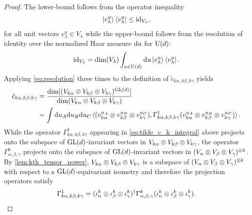 \documentclass[notitlepage, 10pt]{article}
\begin{document}
\begin{proof}
    The lower-bound follows from the operator inequality
     \begin{equation}
         \label{eq:inclusivity}
         \ket{v_{\lambda}^{u}}\bra{v_{\lambda}^{u}} \leq \operatorname{id}_{V_{\lambda}},
    \end{equation}
    for all unit vectors $v_{\lambda}^{u} \in V_{\lambda}$ while the upper-bound follows from the resolution of identity over the normalized Haar measure $\mathrm{d} u$ for $\operatorname{U}(d)$:
    \begin{equation}
        \label{eq:resolution}
        \operatorname{id}_{V_{\lambda}} = \dim(V_{\lambda}) \int_{u\in\operatorname{U}(d)} \mathrm{d} u \ket{v_{\lambda}^{u}}\bra{v_{\lambda}^{u}}.
    \end{equation}
    Applying \cref{eq:resolution} three times to the definition of $\tilde c_{k\alpha,k\beta,k\gamma}$ yields
    \begin{align}
        \label{eq:tilde_c_k_integral}
        \begin{split}
            \tilde c_{k\alpha, k\beta, k\gamma} 
            &= \frac{\dim[(V_{k\alpha} \otimes V_{k\beta} \otimes V_{k\gamma})^{\operatorname{GL}(d)}]}{\dim(V_{k\alpha} \otimes V_{k\beta} \otimes V_{k\gamma})} \\
            &= \int \mathrm{d} u_A \mathrm{d} u_B \mathrm{d} u_C \braket{(v_{k\alpha}^{u_A} \otimes v_{k\beta}^{u_B} \otimes v_{k\gamma}^{u_C}), \Gamma_{k\alpha,k\beta,k\gamma}^{1} (v_{k\alpha}^{u_A} \otimes v_{k\beta}^{u_B} \otimes v_{k\gamma}^{u_C})}.
        \end{split}
    \end{align}
    While the operator $\Gamma_{k\alpha,k\beta,k\gamma}^{1}$ appearing in \cref{eq:tilde_c_k_integral} above projects onto the subspace of $\operatorname{GL}(d)$-invariant vectors in $V_{k\alpha}\otimes V_{k\beta} \otimes V_{k\gamma}$, the operator $\Gamma_{\alpha,\beta,\gamma}^{k}$ projects onto the subspace of $\operatorname{GL}(d)$-invariant vectors in $(V_{\alpha}\otimes V_{\beta} \otimes V_{\gamma})^{\otimes k}$.
    By \cref{lem:kth_tensor_power}, $V_{k\alpha}\otimes V_{k\beta} \otimes V_{k\gamma}$ is a subspace of $(V_{\alpha}\otimes V_{\beta} \otimes V_{\gamma})^{\otimes k}$ with respect to a $\operatorname{GL}(d)$-equivariant isometry and therefore the projection operators satisfy
    \begin{equation}
        \Gamma_{k\alpha,k\beta,k\gamma}^{1} = (\iota_{\alpha}^{k}\otimes\iota_{\beta}^{k}\otimes\iota_{\gamma}^{k})^{\dagger} \Gamma_{\alpha,\beta,\gamma}^{k} (\iota_{\alpha}^{k}\otimes\iota_{\beta}^{k}\otimes\iota_{\gamma}^{k}).
    \end{equation}

\end{proof}
\end{document}
